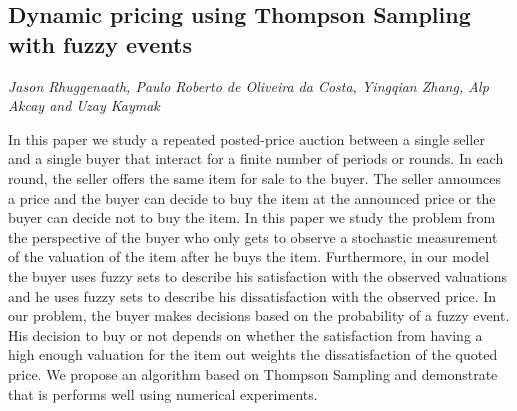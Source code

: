 \documentclass[../booklet.tex]{subfiles}
\begin{document}
\subsection[Dynamic pricing using Thompson Sampling with fuzzy events. {\it Jason Rhuggenaath, Paulo Roberto de Oliveira da Costa, Yingqian Zhang, Alp Akcay and Uzay Kaymak}]{Dynamic pricing using Thompson Sampling with fuzzy events}
    

\begin{center}
  {\it Jason Rhuggenaath, Paulo Roberto de Oliveira da Costa, Yingqian Zhang, Alp Akcay and Uzay Kaymak}
\end{center}



In this paper we study  a repeated posted-price auction between a single seller and a single buyer that interact for a finite number of periods or rounds. In each round, the seller offers the same item for sale to the buyer. The seller announces a price and the buyer can decide to buy the item at the announced price or the buyer can decide not to buy the item. In this paper we study the problem from the perspective of the buyer who only gets to observe a stochastic measurement of the valuation of the item after he buys the item. Furthermore, in our model the buyer uses fuzzy sets to describe his satisfaction with the observed valuations and he uses fuzzy sets to describe his dissatisfaction with the observed price. In our problem, the buyer makes decisions based on the probability of a fuzzy event. His decision to buy or not depends on whether the satisfaction from having a high enough valuation for the item out weights the dissatisfaction of the quoted price.  We propose an algorithm based on Thompson Sampling and demonstrate that is performs well using numerical experiments. 
\end{document}
